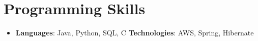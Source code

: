 \documentclass[letterpaper,11pt]{article}
\newcommand{\resumeSubHeadingListStart}{\begin{itemize}[leftmargin=*]}
\newcommand{\resumeSubHeadingListEnd}{\end{itemize}}
\begin{document}
%
\section{Programming Skills}
 \resumeSubHeadingListStart
   \item{
     \textbf{Languages}{: Java, Python, SQL, C }
     \hfill
     \textbf{Technologies}{: AWS, Spring, Hibernate}
   }
 \resumeSubHeadingListEnd


\end{document}
